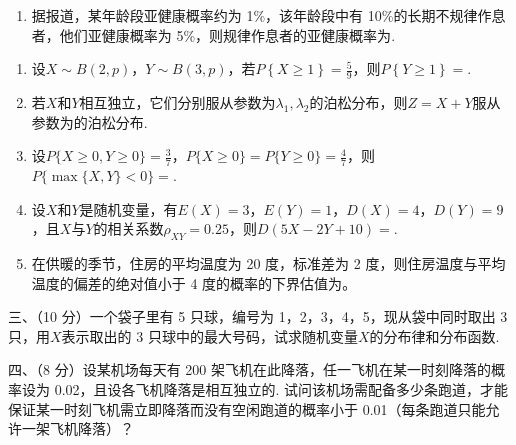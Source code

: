 \documentclass[fontset=exam]{exam-zh}
\begin{document}
\begin{enumerate}
\def\labelenumi{\arabic{enumi}.}
\item
  据报道，某年龄段亚健康概率约为 1\%，该年龄段中有 10\%的长期不规律作息者，他们亚健康概率为 5\%，则规律作息者的亚健康概率为\underline{\hspace{2cm}}.
\end{enumerate}

\begin{enumerate}
\def\labelenumi{\arabic{enumi}.}
\setcounter{enumi}{1}
\item
  设\(\left. X \right.\sim\left. B(2,p)\text{，}\allowbreak Y \right.\sim B(3,p)\)，若\(P\left\{ X \geq 1 \right\} = \frac{5}{9}\)，则\(P\left\{ Y \geq 1 \right\} =\)\underline{\hspace{2cm}}.
\item
  若\(X\)和\(Y\)相互独立，它们分别服从参数为\(\lambda_{1},\lambda_{2}\)的泊松分布，则\(Z = X + Y\)服从参数为\underline{\hspace{2cm}}的泊松分布.
\item
  设\(P\{X\ge 0,Y\ge 0\}=\frac{3}{7}\)，\(P\{X\ge 0\}=P\{Y\ge 0\}=\frac{4}{7}\)，则\(P\{\max\{X,Y\}<0\}=\)\underline{\hspace{2cm}}.
\item
  设\(X\)和\(Y\)是随机变量，有\(E(X) = 3\text{，}\allowbreak E(Y) = 1\text{，}\allowbreak D(X) = 4\text{，}\allowbreak D(Y) = 9\)，且\(X\)与\(Y\)的相关系数\(\rho_{XY} = 0.25\)，则\(D(5X - 2Y + 10) =\)\underline{\hspace{2cm}}.
\item
  在供暖的季节，住房的平均温度为 20 度，标准差为 2 度，则住房温度与平均温度的偏差的绝对值小于 4 度的概率的下界估值为\underline{\hspace{2cm}}。
\end{enumerate}


三、（10 分）一个袋子里有 5 只球，编号为 1，2，3，4，5，现从袋中同时取出 3 只，用\(X\)表示取出的 3 只球中的最大号码，试求随机变量\(X\)的分布律和分布函数.


四、（8 分）设某机场每天有 200 架飞机在此降落，任一飞机在某一时刻降落的概率设为 0.02，且设各飞机降落是相互独立的. 试问该机场需配备多少条跑道，才能保证某一时刻飞机需立即降落而没有空闲跑道的概率小于 0.01（每条跑道只能允许一架飞机降落）？
\end{document}
